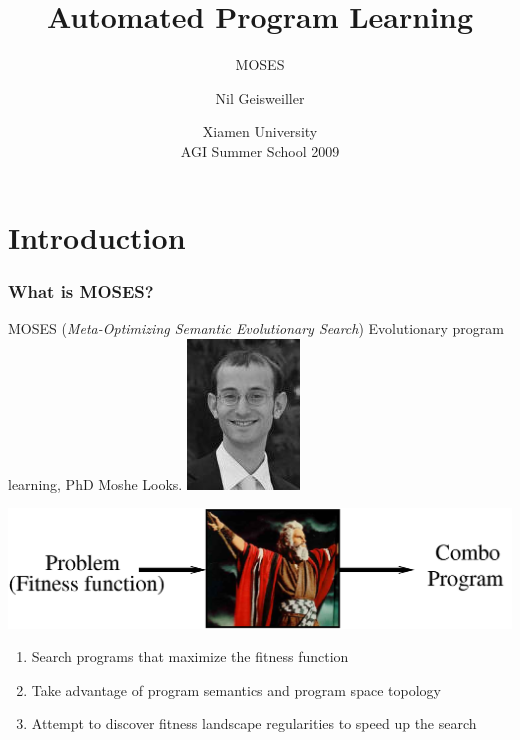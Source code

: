 \documentclass{beamer}
\title{Automated Program Learning}
\subtitle{MOSES}
\author{Nil Geisweiller}
\institute[Xiamen University] %
{
  Novamente LLC
}
\date[Xiamen University AGI Summer School 2009] %
{Xiamen University\\ AGI Summer School 2009}
\begin{document}
\frame
{
  \maketitle
}
\section[Outline]{}
\frame{\tableofcontents}

\section{Introduction}

\frame
{
  \frametitle{What is MOSES?}
  
  MOSES (\emph{Meta-Optimizing Semantic Evolutionary Search})
  Evolutionary program learning, PhD Moshe Looks.
  \includegraphics[scale=0.25]{moshe_head_bw.jpg}

  \begin{center}

  \includegraphics[scale=0.15]{MOSESSum2.png}

  \end{center}

  \begin{enumerate}
    \item<+-> Search programs that \alert{maximize the fitness} function
    \item<+-> Take advantage of \alert{program semantics}
      and program space topology
    \item<+-> Attempt to discover \alert{fitness landscape
        regularities to speed up the search}
    \end{enumerate}

}
\end{document}
